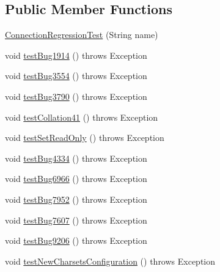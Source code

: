 \subsection*{Public Member Functions}
\begin{DoxyCompactItemize}
\item 
\mbox{\hyperlink{classtestsuite_1_1regression_1_1_connection_regression_test_aafc0f9ce5c17349773526cb4dc1d0cd7}{Connection\+Regression\+Test}} (String name)
\item 
void \mbox{\hyperlink{classtestsuite_1_1regression_1_1_connection_regression_test_a4e3b703a4128c3a6aef0462052f61225}{test\+Bug1914}} ()  throws Exception 
\item 
void \mbox{\hyperlink{classtestsuite_1_1regression_1_1_connection_regression_test_a37a5b68fc2ee7b632c08744bc7579f29}{test\+Bug3554}} ()  throws Exception 
\item 
void \mbox{\hyperlink{classtestsuite_1_1regression_1_1_connection_regression_test_a54ef158c3ee3231b4628a9509b299642}{test\+Bug3790}} ()  throws Exception 
\item 
void \mbox{\hyperlink{classtestsuite_1_1regression_1_1_connection_regression_test_a8bca083f14a9aedf92ba2d80fd44a71f}{test\+Collation41}} ()  throws Exception 
\item 
void \mbox{\hyperlink{classtestsuite_1_1regression_1_1_connection_regression_test_ae79808e3889aec702379cc6fe4163e22}{test\+Set\+Read\+Only}} ()  throws Exception 
\item 
void \mbox{\hyperlink{classtestsuite_1_1regression_1_1_connection_regression_test_a83abae1bb52b0bab9efe6949e40faecf}{test\+Bug4334}} ()  throws Exception 
\item 
void \mbox{\hyperlink{classtestsuite_1_1regression_1_1_connection_regression_test_ad40619b88e8c45d0c604f376a8d0fd91}{test\+Bug6966}} ()  throws Exception 
\item 
void \mbox{\hyperlink{classtestsuite_1_1regression_1_1_connection_regression_test_a678832d70128500168a8e75e47930a55}{test\+Bug7952}} ()  throws Exception 
\item 
void \mbox{\hyperlink{classtestsuite_1_1regression_1_1_connection_regression_test_a546e675781e810a5d2ba2f12d41a3f24}{test\+Bug7607}} ()  throws Exception 
\item 
void \mbox{\hyperlink{classtestsuite_1_1regression_1_1_connection_regression_test_a296d1449fdc8a1628b7029ab70e450e8}{test\+Bug9206}} ()  throws Exception 
\item 
void \mbox{\hyperlink{classtestsuite_1_1regression_1_1_connection_regression_test_a3e4f6c5f1867be7b76a82e9c0344cc5c}{test\+New\+Charsets\+Configuration}} ()  throws Exception 

\end{DoxyCompactItemize}
